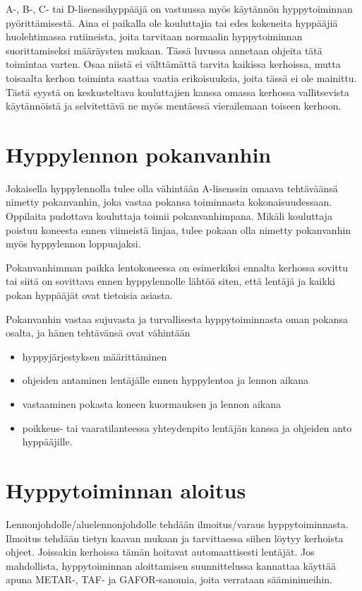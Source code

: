
A\mbox{-,} B\mbox{-,} C- tai D-lisenssihyppääjä on vastuussa myös käytännön hyppytoiminnan pyörittämisestä. Aina ei paikalla ole kouluttajia tai edes kokeneita hyppääjiä huolehtimassa rutiineista, joita tarvitaan normaalin hyppytoiminnan suorittamiseksi määräysten mukaan. Tässä luvussa annetaan ohjeita tätä toimintaa varten. Osaa niistä ei välttämättä tarvita kaikissa kerhoissa, mutta toisaalta kerhon toiminta saattaa vaatia erikoisuuksia, joita tässä ei ole mainittu. Tästä syystä on keskusteltava kouluttajien kanssa omassa kerhossa vallitsevista käytännöistä ja selvitettävä ne myös mentäessä vierailemaan toiseen kerhoon. 

\section{ Hyppylennon pokanvanhin }
\label{hyppytoiminnan-jarjestaminen-hyppylennon-pokanvanhin}


Jokaisella hyppylennolla tulee olla vähintään A-lisenssin omaava tehtäväänsä nimetty pokanvanhin, joka vastaa pokansa toiminnasta kokonaisuudessaan. Oppilaita pudottava kouluttaja toimii pokanvanhimpana. Mikäli kouluttaja poistuu koneesta ennen viimeistä linjaa, tulee pokaan olla nimetty pokanvanhin myös hyppylennon loppuajaksi.  


Pokanvanhimman paikka lentokoneessa on esimerkiksi ennalta kerhossa sovittu tai siitä on sovittava ennen hyppylennolle lähtöä siten, että lentäjä ja kaikki pokan hyppääjät ovat tietoisia asiasta.  


Pokanvanhin vastaa sujuvasta ja turvallisesta hyppytoiminnasta oman pokansa osalta, ja hänen tehtävänsä ovat vähintään 

\begin{itemize}
\item  hyppyjärjestyksen määrittäminen 
\item  ohjeiden antaminen lentäjälle ennen hyppylentoa ja lennon aikana 
\item  vastaaminen pokasta koneen kuormauksen ja lennon aikana 
\item  poikkeus- tai vaaratilanteessa yhteydenpito lentäjän kanssa ja ohjeiden anto hyppääjille. 
\end{itemize}
\section{ Hyppytoiminnan aloitus }
\label{hyppytoiminnan-jarjestaminen-hyppytoiminnan-aloitus}


Lennonjohdolle/aluelennonjohdolle tehdään ilmoitus/varaus hyppytoiminnasta. Ilmoitus tehdään tietyn kaavan mukaan ja tarvittaessa siihen löytyy kerhoista ohjeet. Joissakin kerhoissa tämän hoitavat automaattisesti lentäjät. Jos mahdollista, hyppytoiminnan aloittamisen suunnittelussa kannattaa käyttää apuna METAR\mbox{-,} TAF- ja GAFOR-sanomia, joita verrataan sääminimeihin. 


